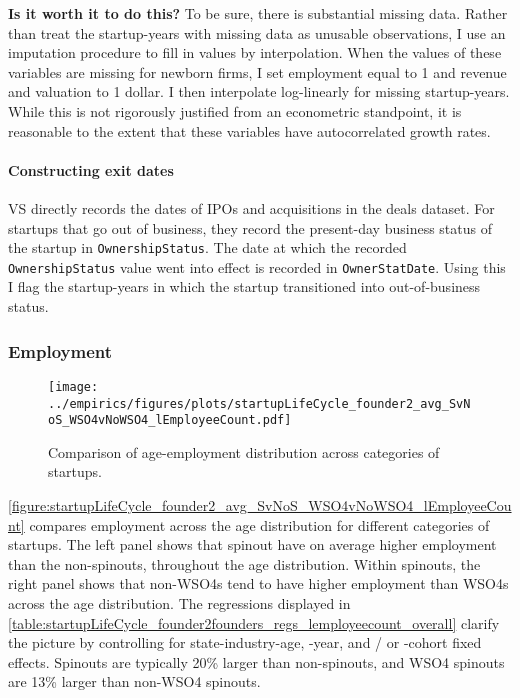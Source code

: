 \documentclass[12pt,english]{article}
\theoremstyle{remark}
\begin{document}
\textbf{Is it worth it to do this?} To be sure, there is substantial missing data. Rather than treat the startup-years with missing data as unusable observations, I use an imputation procedure to fill in values by interpolation. When the values of these variables are missing for newborn firms, I set employment equal to 1 and revenue and valuation to 1 dollar. I then interpolate log-linearly for missing startup-years. While this is not rigorously justified from an econometric standpoint, it is reasonable to the extent that these variables have autocorrelated growth rates. 

\paragraph{Constructing exit dates}

VS directly records the dates of IPOs and acquisitions in the deals dataset. For startups that go out of business, they record the present-day business status of the startup in \texttt{OwnershipStatus}. The date at which the recorded \texttt{OwnershipStatus} value went into effect is recorded in \texttt{OwnerStatDate}. Using this I flag the startup-years in which the startup transitioned into out-of-business status.

\subsubsection{Employment}

\begin{figure}[]
	\centering
	\texttt{[image: ../empirics/figures/plots/startupLifeCycle\_founder2\_avg\_SvNoS\_WSO4vNoWSO4\_lEmployeeCount.pdf]}
	\caption{Comparison of age-employment distribution across categories of startups.}
	\label{figure:startupLifeCycle_founder2_avg_SvNoS_WSO4vNoWSO4_lEmployeeCount}
\end{figure}

\autoref{figure:startupLifeCycle_founder2_avg_SvNoS_WSO4vNoWSO4_lEmployeeCount} compares employment across the age distribution for different categories of startups. The left panel shows that spinout have on average higher employment than the non-spinouts, throughout the age distribution. Within spinouts, the right panel shows that non-WSO4s tend to have higher employment than WSO4s across the age distribution. The regressions displayed in \autoref{table:startupLifeCycle_founder2founders_regs_lemployeecount_overall} clarify the picture by controlling for state-industry-age, -year, and / or -cohort fixed effects. Spinouts are typically 20\% larger than non-spinouts, and WSO4 spinouts are 13\% larger than non-WSO4 spinouts. 
\end{document}
